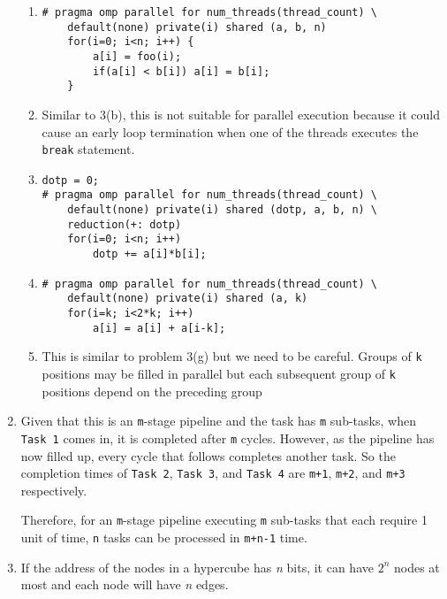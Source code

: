 \documentclass{article}
\begin{document}
\begin{enumerate}
\begin{enumerate}[label=(\alph*)]
    \item
\begin{lstlisting}
# pragma omp parallel for num_threads(thread_count) \
    default(none) private(i) shared (a, b, n)
    for(i=0; i<n; i++) {
        a[i] = foo(i);
        if(a[i] < b[i]) a[i] = b[i];
    }
\end{lstlisting}

    \item
    Similar to 3(b), this is not suitable for parallel execution because it
    could cause an early loop termination when one of the threads executes the 
    \texttt{break} statement.
    
    \item
\begin{lstlisting}
dotp = 0;
# pragma omp parallel for num_threads(thread_count) \
    default(none) private(i) shared (dotp, a, b, n) \
    reduction(+: dotp)
    for(i=0; i<n; i++)
        dotp += a[i]*b[i];
\end{lstlisting}
        
    \item
\begin{lstlisting}
# pragma omp parallel for num_threads(thread_count) \
    default(none) private(i) shared (a, k) 
    for(i=k; i<2*k; i++)
        a[i] = a[i] + a[i-k];
\end{lstlisting}

    \item
    This is similar to problem 3(g) but we need to be careful. Groups of
    \texttt{k} positions may be filled in parallel but each subsequent group of
    \texttt{k} positions depend on the preceding group
    
\end{enumerate} 

\item
Given that this is an \texttt{m}-stage pipeline and the task has \texttt{m} 
sub-tasks, when \texttt{Task 1} comes in, it is completed after \texttt{m} 
cycles. However, as the pipeline has now filled up, every cycle that follows 
completes another task. So the completion times of \texttt{Task 2}, 
\texttt{Task 3}, and \texttt{Task 4} are \texttt{m+1}, \texttt{m+2}, and 
\texttt{m+3} respectively. 

Therefore, for an \texttt{m}-stage pipeline executing \texttt{m} sub-tasks that 
each require 1 unit of time, \texttt{n} tasks can be processed in \texttt{m+n-1}
time.

\item
If the address of the nodes in a hypercube has \textit{n} bits, it can have 
$2^n$ nodes at most and each node will have \textit{n} edges.


\end{enumerate}
\end{document}
